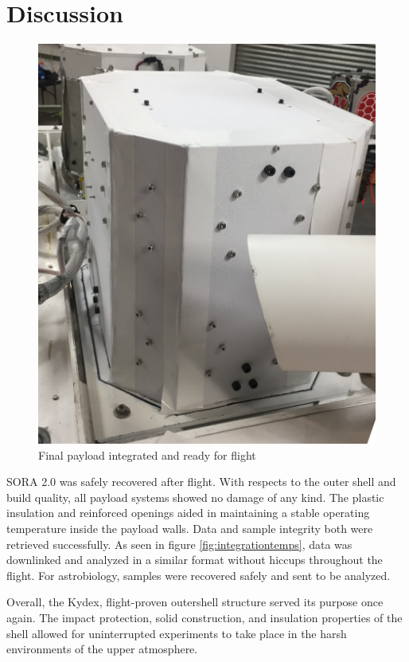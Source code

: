 \clearpage
\section{Discussion}
\label{sec:Discussion}
\begin{figure}[h!]
	\begin{center}
		\includegraphics[width=70 mm, scale=1]{figures/payload_integrated.JPG}
		\caption{Final payload integrated and ready for flight}
		\label{fig:payload_int}
	\end{center}
\end{figure}

SORA 2.0 was safely recovered after flight.  With respects to the outer shell and build quality, all payload systems showed no damage of any kind.  The plastic insulation and reinforced openings aided in maintaining a stable operating temperature inside the payload walls.  Data and sample integrity both were retrieved successfully.  As seen in figure \ref{fig:integrationtemps}, data was downlinked and analyzed in a similar format without hiccups throughout the flight.  For astrobiology, samples were recovered safely and sent to be analyzed.  

Overall, the Kydex, flight-proven outershell structure served its purpose once again.  The impact protection, solid construction, and insulation properties of the shell allowed for uninterrupted experiments to take place in the harsh environments of the upper atmosphere.